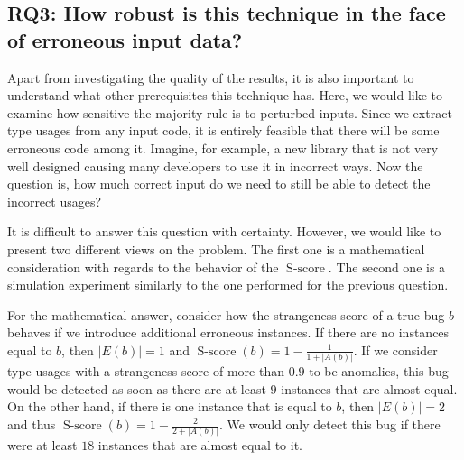 
\subsection{RQ3: How robust is this technique in the face of erroneous input data?}


Apart from investigating the quality of the results, it is also important to understand what other prerequisites this technique has.
Here, we would like to examine how sensitive the majority rule is to perturbed inputs.
Since we extract type usages from any input code, it is entirely feasible that there will be some erroneous code among it.
Imagine, for example, a new library that is not very well designed causing many developers to use it in incorrect ways.
Now the question is, how much correct input do we need to still be able to detect the incorrect usages?

It is difficult to answer this question with certainty.
However, we would like to present two different views on the problem.
The first one is a mathematical consideration with regards to the behavior of the $\operatorname{S-score}$.
The second one is a simulation experiment similarly to the one performed for the previous question.

For the mathematical answer, consider how the strangeness score of a true bug $b$ behaves if we introduce additional erroneous instances.
If there are no instances equal to $b$, then $|E(b)|=1$ and $\operatorname{S-score}(b)=1-\frac{1}{1+|A(b)|}$.
If we consider type usages with a strangeness score of more than $0.9$ to be anomalies, this bug would be detected as soon as there are at least $9$ instances that are almost equal.
On the other hand, if there is one instance that is equal to $b$, then $|E(b)|=2$ and thus $\operatorname{S-score}(b)=1-\frac{2}{2+|A(b)|}$.
We would only detect this bug if there were at least $18$ instances that are almost equal to it.

